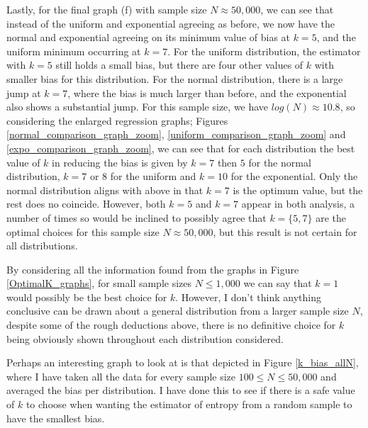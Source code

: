 \documentclass[12pt]{report}
\begin{document}
Lastly, for the final graph (f) with sample size $N \approx 50,000$, we can see that instead of the uniform and exponential agreeing as before, we now have the normal and exponential agreeing on its minimum value of bias at $k=5$, and the uniform minimum occurring at $k=7$. For the uniform distribution, the estimator with $k=5$ still holds a small bias, but there are four other values of $k$ with smaller bias for this distribution. For the normal distribution, there is a large jump at $k=7$, where the bias is much larger than before, and the exponential also shows a substantial jump. For this sample size, we have $log(N) \approx 10.8$, so considering the enlarged regression graphs; Figures \ref{normal_comparison_graph_zoom}, \ref{uniform_comparison_graph_zoom} and \ref{expo_comparison_graph_zoom}, we can see that for each distribution the best value of $k$ in reducing the bias is given by $k=7$ then $5$ for the normal distribution, $k=7$ or $8$ for the uniform and $k=10$ for the exponential. Only the normal distribution aligns with above in that $k=7$ is the optimum value, but the rest does no coincide. However, both $k=5$ and $k=7$ appear in both analysis, a number of times so would be inclined to possibly agree that $k= \{5, 7\}$ are the optimal choices for this sample size $N \approx 50,000$, but this result is not certain for all distributions. 


By considering all the information found from the graphs in Figure \ref{OptimalK_graphs}, for small sample sizes $N \leq 1,000$ we can say that $k=1$ would possibly be the best choice for $k$. However, I don't think anything conclusive can be drawn about a general distribution from a larger sample size $N$, despite some of the rough deductions above, there is no definitive choice for $k$ being obviously shown throughout each distribution considered. 

Perhaps an interesting graph to look at is that depicted in Figure \ref{k_bias_allN}, where I have taken all the data for every sample size $100 \leq N \leq 50,000$ and averaged the bias per distribution. I have done this to see if there is a safe value of $k$ to choose when wanting the estimator of entropy from a random sample to have the smallest bias.
\end{document}
